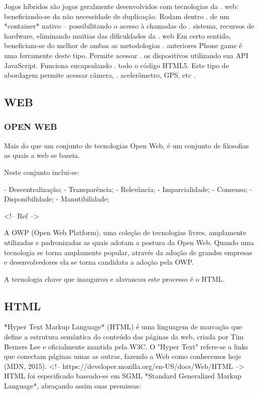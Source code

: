 \documentclass[11pt,a4paper]{article}
\begin{document}
Jogos híbridos são jogos geralmente desenvolvidos com tecnologias da .
web: beneficiando-se da não necessidade de duplicação. Rodam dentro .
de um *container* nativo – possibilitando o acesso à chamadas do    .
sistema, recursos de hardware, eliminando muitias das dificuldades da  .
web Em certo sentido, beneficiam-se do melhor de ambas as metodologias .
anteriores Phone game é uma ferramente deste tipo. Permite acessar    .
os dispositivos utilizando sua API JavaScript. Funciona encapsulando   .
todo o código HTML5. Este tipo de abordagem permite acessar câmera,  .
acelerômetro, GPS, etc                                                .

\subsection{WEB}

\subsubsection{OPEN WEB}

Mais do que um conjunto de tecnologias Open Web, é um conjunto de
filosofias as quais a web se baseia.

Neste conjunto inclui-se:

- Descentralização;
- Transparência;
- Relevância;
- Imparcialidade;
- Consenso;
- Disponibilidade;
- Manutibilidade;

<!-- Ref
-->

A OWP (Open Web Platform), uma coleção de tecnologias livres,
amplamente utilizadas e padronizadas as quais adotam a postura da Open
Web. Quando uma tecnologia se torna amplamente popular, através da
adoção de grandes empresas e desenvolvedores ela se torna candidata a
adoção pela OWP.

A tecnologia chave que inaugurou e alavancou este processo é o HTML. 

\subsection{HTML}

*Hyper Text Markup Language* (HTML) é uma linguagem de marcação
que define a estrutura semântica do conteúdo das páginas da
web, criada por Tim Berners Lee e oficialmente mantida pela W3C.
O "Hyper Text" refere-se a links que conectam páginas umas as
outras, fazendo a Web como conhecemos hoje (MDN, 2015). 
<!--
https://developer.mozilla.org/en-US/docs/Web/HTML --> HTML foi
especificado baseado-se em SGML *Standard Generalized Markup Language*,
abraçando assim suas premissas:
\end{document}
